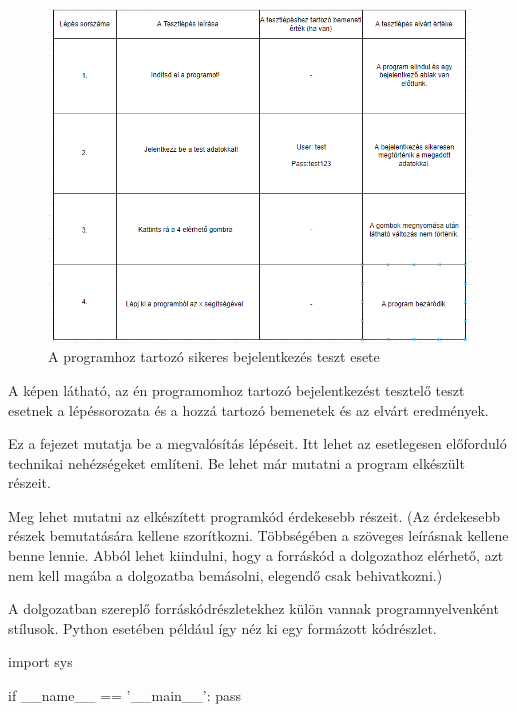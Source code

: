 \begin{figure}
	\centering
	\includegraphics[scale=0.86]{images/success_login_test_case.png}
	\caption{A programhoz tartozó sikeres bejelentkezés teszt esete}
	\label{fig:successcase}
\end{figure}

A  képen látható, az én programomhoz tartozó bejelentkezést tesztelő teszt esetnek a lépéssorozata és a hozzá tartozó bemenetek és az elvárt eredmények.


Ez a fejezet mutatja be a megvalósítás lépéseit.
Itt lehet az esetlegesen előforduló technikai nehézségeket említeni.
Be lehet már mutatni a program elkészült részeit.

Meg lehet mutatni az elkészített programkód érdekesebb részeit.
(Az érdekesebb részek bemutatására kellene szorítkozni.
Többségében a szöveges leírásnak kellene benne lennie.
Abból lehet kiindulni, hogy a forráskód a dolgozathoz elérhető, azt nem kell magába a dolgozatba bemásolni, elegendő csak behivatkozni.)

A dolgozatban szereplő forráskódrészletekhez külön vannak programnyelvenként stílusok.
Python esetében például így néz ki egy formázott kódrészlet.
\begin{python}
import sys

if __name__ == '__main__':
    pass
\end{python}

